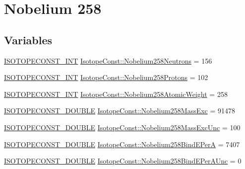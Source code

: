 \hypertarget{group___isotope_const-_nobelium-_no258}{}\section{Nobelium 258}
\label{group___isotope_const-_nobelium-_no258}
\subsection*{Variables}
\begin{DoxyCompactItemize}
\item 
\mbox{\hyperlink{group___isotope_const-_macros_ga5f18360b3e99483a35c32d789e62621c}{I\+S\+O\+T\+O\+P\+E\+C\+O\+N\+S\+T\+\_\+\+I\+NT}} \mbox{\hyperlink{group___isotope_const-_nobelium-_no258_ga8ce3cebcd6eec9a56b221acb575952f3}{Isotope\+Const\+::\+Nobelium258\+Neutrons}} = 156
\item 
\mbox{\hyperlink{group___isotope_const-_macros_ga5f18360b3e99483a35c32d789e62621c}{I\+S\+O\+T\+O\+P\+E\+C\+O\+N\+S\+T\+\_\+\+I\+NT}} \mbox{\hyperlink{group___isotope_const-_nobelium-_no258_ga7330b7c22856805e66a57476ead1345e}{Isotope\+Const\+::\+Nobelium258\+Protons}} = 102
\item 
\mbox{\hyperlink{group___isotope_const-_macros_ga5f18360b3e99483a35c32d789e62621c}{I\+S\+O\+T\+O\+P\+E\+C\+O\+N\+S\+T\+\_\+\+I\+NT}} \mbox{\hyperlink{group___isotope_const-_nobelium-_no258_gadad9920b21d3cf3b6666777727b71dfb}{Isotope\+Const\+::\+Nobelium258\+Atomic\+Weight}} = 258
\item 
\mbox{\hyperlink{group___isotope_const-_macros_ga8f45a7272ce02c0b4c65c44636ed719a}{I\+S\+O\+T\+O\+P\+E\+C\+O\+N\+S\+T\+\_\+\+D\+O\+U\+B\+LE}} \mbox{\hyperlink{group___isotope_const-_nobelium-_no258_gab9e81c033a1d6a486502d9a0ce7f83fc}{Isotope\+Const\+::\+Nobelium258\+Mass\+Exc}} = 91478
\item 
\mbox{\hyperlink{group___isotope_const-_macros_ga8f45a7272ce02c0b4c65c44636ed719a}{I\+S\+O\+T\+O\+P\+E\+C\+O\+N\+S\+T\+\_\+\+D\+O\+U\+B\+LE}} \mbox{\hyperlink{group___isotope_const-_nobelium-_no258_ga2b2a978990df0bf4cbdda7db4fa207a9}{Isotope\+Const\+::\+Nobelium258\+Mass\+Exc\+Unc}} = 100
\item 
\mbox{\hyperlink{group___isotope_const-_macros_ga8f45a7272ce02c0b4c65c44636ed719a}{I\+S\+O\+T\+O\+P\+E\+C\+O\+N\+S\+T\+\_\+\+D\+O\+U\+B\+LE}} \mbox{\hyperlink{group___isotope_const-_nobelium-_no258_gafcf1d58b8d03d3d88b525c89443b935e}{Isotope\+Const\+::\+Nobelium258\+Bind\+E\+PerA}} = 7407
\item 
\mbox{\hyperlink{group___isotope_const-_macros_ga8f45a7272ce02c0b4c65c44636ed719a}{I\+S\+O\+T\+O\+P\+E\+C\+O\+N\+S\+T\+\_\+\+D\+O\+U\+B\+LE}} \mbox{\hyperlink{group___isotope_const-_nobelium-_no258_ga8fc3fe26c84bd15540075dbc1d51c58b}{Isotope\+Const\+::\+Nobelium258\+Bind\+E\+Per\+A\+Unc}} = 0

\end{DoxyCompactItemize}
